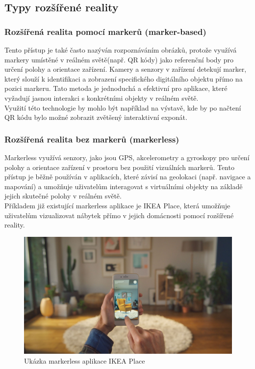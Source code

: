 \subsection{Typy rozšířené reality}
\subsubsection{Rozšířená realita pomocí markerů (marker-based)}
Tento přístup je také často nazýván rozpoznáváním obrázků, protože využívá markery umístěné v reálném světě(např. QR kódy) jako referenční body pro určení polohy a orientace zařízení. Kamery a senzory v zařízení detekují marker, který slouží k identifikaci a zobrazení specifického digitálního objektu přímo na pozici markeru. Tato metoda je jednoduchá a efektivní pro aplikace, které vyžadují jasnou interakci s konkrétními objekty v reálném světě. \cite  {AROverview} \\
Využití této technologie by mohlo být například na výstavě, kde by po načtení QR kódu bylo možné zobrazit zvětšený interaktivní exponát.
\subsubsection{Rozšířená realita bez markerů (markerless)}
Markerless využívá senzory, jako jsou GPS, akcelerometry a gyroskopy pro určení polohy a orientace zařízení v prostoru bez použití vizuálních markerů. Tento přístup je běžně používán v aplikacích, které závisí na geolokaci (např. navigace a mapování) a umožňuje uživatelům interagovat s virtuálními objekty na základě jejich skutečné polohy v reálném světě. \cite{AROverview} \\
Příkladem již existující markerless aplikace je IKEA Place, která umožňuje uživatelům vizualizovat nábytek přímo v jejich domácnosti pomocí rozšířené reality. \cite{IkeaPlace} \\
\begin{figure}[h]
    \centering
    \includegraphics[scale=0.2]{images/ikea}
    \caption{Ukázka markerless aplikace IKEA Place}
    \label{fig:ikea}
\end{figure}


